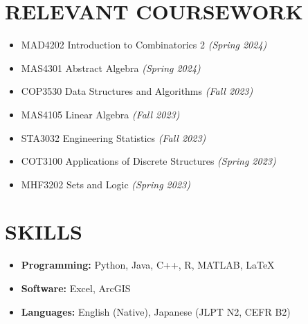 \documentclass[a4paper,9pt]{extarticle}
\begin{document}
\section*{RELEVANT COURSEWORK}
\begin{itemize}
     \item MAD4202 Introduction to Combinatorics 2 \textit{(Spring 2024)}
     \item MAS4301 Abstract Algebra \textit{(Spring 2024)}
     \item COP3530 Data Structures and Algorithms \textit{(Fall 2023)}
     \item MAS4105 Linear Algebra \textit{(Fall 2023)}
     \item STA3032 Engineering Statistics \textit{(Fall 2023)}
     \item COT3100 Applications of Discrete Structures \textit{(Spring 2023)}
     \item MHF3202 Sets and Logic \textit{(Spring 2023)}
 \end{itemize}

\section*{SKILLS}
\begin{itemize}
    \item \textbf{Programming:} Python, Java, C++, R, MATLAB, \LaTeX
    \item \textbf{Software:} Excel, ArcGIS
    \item \textbf{Languages:} English (Native), Japanese (JLPT N2, CEFR B2)
\end{itemize}

\end{document}
